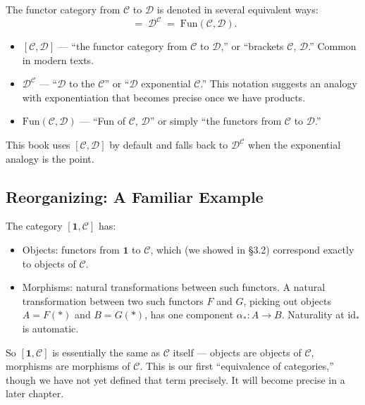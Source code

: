 The functor category from $\mathcal{C}$ to $\mathcal{D}$ is denoted in
several equivalent ways:
\begin{equation*}
  [\mathcal{C}, \mathcal{D}]
  \;=\; \mathcal{D}^{\mathcal{C}}
  \;=\; \mathrm{Fun}(\mathcal{C}, \mathcal{D}).
\end{equation*}

\begin{howtosay}
\begin{itemize}
  \item $[\mathcal{C}, \mathcal{D}]$ — ``the functor category from
        $\mathcal{C}$ to $\mathcal{D}$,'' or ``brackets $\mathcal{C}$,
        $\mathcal{D}$.'' Common in modern texts.
  \item $\mathcal{D}^{\mathcal{C}}$ — ``$\mathcal{D}$ to the $\mathcal{C}$''
        or ``$\mathcal{D}$ exponential $\mathcal{C}$.'' This notation
        suggests an analogy with exponentiation that becomes precise once
        we have products.
  \item $\mathrm{Fun}(\mathcal{C}, \mathcal{D})$ — ``Fun of $\mathcal{C}$,
        $\mathcal{D}$'' or simply ``the functors from $\mathcal{C}$ to
        $\mathcal{D}$.''
\end{itemize}
This book uses $[\mathcal{C}, \mathcal{D}]$ by default and falls back to
$\mathcal{D}^{\mathcal{C}}$ when the exponential analogy is the point.
\end{howtosay}

\subsection{Reorganizing: A Familiar Example}

The category $[\mathbf{1}, \mathcal{C}]$ has:
\begin{itemize}
  \item Objects: functors from $\mathbf{1}$ to $\mathcal{C}$, which (we
        showed in \S3.2) correspond exactly to objects of $\mathcal{C}$.
  \item Morphisms: natural transformations between such functors. A natural
        transformation between two such functors $F$ and $G$, picking out
        objects $A = F(*)$ and $B = G(*)$, has one component
        $\alpha_* : A \to B$. Naturality at $\mathrm{id}_*$ is automatic.
\end{itemize}

So $[\mathbf{1}, \mathcal{C}]$ is essentially the same as $\mathcal{C}$
itself --- objects are objects of $\mathcal{C}$, morphisms are morphisms of
$\mathcal{C}$. This is our first ``equivalence of categories,'' though we
have not yet defined that term precisely. It will become precise in a later
chapter.

